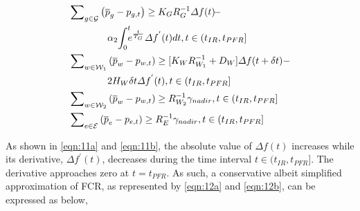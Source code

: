 \documentclass[lettersize,journal]{IEEEtran}
\newenvironment{newsubequations}{\small\begin{subequations}}{\end{subequations}}
\begin{document}
\vspace{-0.125in}
\begin{newsubequations}
	\label{eqn:11}
	\begin{align}
		 & \sum\nolimits_{g\in\mathcal{G}} \left( \overline{p}_{g} -p_{g, t}\right) \geq{K_{G} }{ R_{G}^{-1}} \varDelta f(t) \!- \label{eqn:11a}            \\
		 & \qquad \qquad \alpha_2 \!\int_{0}^{t} \!\!\! e^{\frac{t}{T_G}} \!\!\ \varDelta f^{'}(t)dt,t \in (t_{IR}, t_{PFR}]\notag                          \\
		 & \sum\nolimits_{w\in\mathcal{W}_{1}} \left( \overline{p}_{w} - p_{w, t} \right) \geq [K_{W}R_{W_1}^{-1} + D_{W}]\varDelta f(t+\delta t) -  \notag   \\
		 & \qquad\qquad 2H_W \delta t \varDelta f^{'}(t), t \in (t_{IR}, t_{PFR}] \label{eqn:11b}                                                           \\
		 & \sum\nolimits_{w\in\mathcal{W}_{2}} \left( \overline{p}_{w} - p_{w, t} \right) \geq R_{W_2}^{-1} \gamma_{nadir},t \in (t_{IR}, t_{PFR}] \label{eqn:11c} \\
		 & \sum\nolimits_{e\in\mathcal{E}} \left( \overline{p}_{e} -p_{e, t}\right)  \geq R_{E}^{-1} \gamma_{nadir},t \in (t_{IR}, t_{PFR}] \label{eqn:11d}
	\end{align}\end{newsubequations}



As shown in \eqref{eqn:11a} and \eqref{eqn:11b}, the absolute value of \(\varDelta f(t)\) increases while its derivative, \(\varDelta f^{'}\!(t)\), decreases during the time interval \(t \!\in\! (t_{IR},t_{PFR}]\). The derivative approaches zero at \(t\!=\!t_{PFR}\). As such, a conservative albeit simplified approximation of FCR, as represented by \eqref{eqn:12a} and \eqref{eqn:12b}, can be expressed as below,
\end{document}
